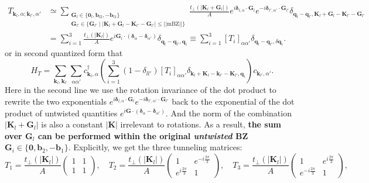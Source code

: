 \begin{align*}
    T_{\bm k_l,\alpha;\bm k_{l'},\alpha'} & \simeq \sum_{\substack{\bm G_l\in\{\bm 0_l,\bm b_{l2},-\bm b_{l1}         \}                                                                                                                                                \\[0.3em] \bm G_{l'}\in\{\bm G_{l'}\mid|\bm K_l+\bm G_l-\bm K_{l'}-\bm G_{l'}|\leq||\text{mBZ}||\}} }\frac{t_\perp(|\bm K_l+\bm G_l|)}{A}  e^{i\bm\delta_{l,\alpha}\cdot\bm G_l}e^{-i\bm \delta_{l',\alpha'}\cdot\bm G_{l'}}\delta_{\bm q_l-\bm q_{l'},\bm K_l+\bm G_l -\bm K_{l'}-\bm G_{l'}}\nonumber \\
                                          & = \sum_{i=1}^3 \frac{t_\perp(|\bm K_l|)}{A} e^{i\bm G_i\cdot(\bm \delta_\alpha-\bm \delta_{\alpha'})}\delta_{\bm q_l-\bm q_{l'},\bm q_i}\equiv \sum_{i=1}^3 [T_i]_{\alpha\alpha'}\delta_{\bm q_l-\bm q_{l'},\delta\bm q_i}.
\end{align*}
or in second quantized form that
\begin{equation}\label{eq:tBLG_tunneling_Hamiltonian}
    H_T=\sum_{\bm k_l,\bm k_{l'}}\sum_{\alpha\alpha'} c_{\bm k_l,\alpha}^\dagger\left(\sum_{i=1}^3 (1-\delta_{ll'})[T_i]_{\alpha\alpha'}\delta_{\bm k_l+\bm K_l-\bm k_{l'}-\bm K_{l'},\bm q_i}\right) c_{\bm k_{l'},\alpha'}.
\end{equation}
Here in the second line we use the rotation invariance of the dot product to rewrite the two exponentials $e^{i\bm\delta_{l,\alpha}\cdot\bm G_l}e^{-i\bm\delta_{l',\alpha'}\cdot\bm G_{l'}}$ back to the exponential of the dot product of untwisted quantities $e^{i\bm G\cdot(\bm\delta_\alpha-\bm\delta_{\alpha'})}$. And the norm of the combination $|\bm K_l+\bm G_l|$ is also a constant $|\bm K|$ irrelevant to rotations. As a result, \textbf{the sum over $\bm G_l$ can be performed within the original \emph{untwisted} BZ $\bm G_i\in\{\bm0,\bm b_2,-\bm b_1\}$}. Explicitly, we get the three tunneling matrices:
\begin{equation*}
    T_1=\frac{t_\perp(|\bm K_l|)}{A}\begin{pmatrix}
        1 & 1 \\
        1 & 1
    \end{pmatrix},\quad
    T_2=\frac{t_\perp(|\bm K_l|)}{A}\begin{pmatrix}
        1                   & e^{-i\frac{2\pi}{3}} \\
        e^{i\frac{2\pi}{3}} & 1
    \end{pmatrix},\quad
    T_3=\frac{t_\perp(|\bm K_l|)}{A}\begin{pmatrix}
        1                    & e^{i\frac{2\pi}{3}} \\
        e^{-i\frac{2\pi}{3}} & 1
    \end{pmatrix},
\end{equation*}

